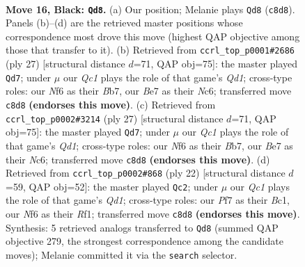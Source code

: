 \documentclass[11pt]{article}
\begin{document}
\clearpage

\begin{figure}[p]\centering
\begin{subfigure}{0.46\textwidth}\centering
\resizebox{\linewidth}{!}{%
\newchessgame
\chessboard[
  setfen={rnq1r1k1/pp1bbppp/4pn2/2Pp4/N2P4/P4N2/1P1B1PPP/1BRQR1K1 b - - 0 16},
  showmover=false,
  pgfstyle=straightmove, color=movearrow, markmove={c8-d8}
]}
\caption{}
\end{subfigure}\hfill
\begin{subfigure}{0.46\textwidth}\centering
\resizebox{\linewidth}{!}{%
\newchessgame
\chessboard[
  setfen={2rq1rk1/pb2bppp/1pn1pn2/8/2NP1B2/P2B1N1P/1P1Q1PP1/2R2RK1 b - - 2 14},
  showmover=false,
  pgfstyle=straightmove, color=movearrow, markmove={d8-d7}
]}
\caption{}
\end{subfigure}
\\[4pt]
\begin{subfigure}{0.46\textwidth}\centering
\resizebox{\linewidth}{!}{%
\newchessgame
\chessboard[
  setfen={2rq1rk1/pb2bppp/1pn1pn2/8/2NP1B2/P2B1N1P/1P1Q1PP1/2R2RK1 b - - 2 14},
  showmover=false,
  pgfstyle=straightmove, color=movearrow, markmove={d8-d7}
]}
\caption{}
\end{subfigure}\hfill
\begin{subfigure}{0.46\textwidth}\centering
\resizebox{\linewidth}{!}{%
\newchessgame
\chessboard[
  setfen={r2qr1k1/pbpn1ppp/1p1b1n2/3p4/1P1P4/P1NBP3/4NPPP/1RBQ1RK1 w - - 3 12},
  showmover=false,
  pgfstyle=straightmove, color=movearrow, markmove={d1-c2}
]}
\caption{}
\end{subfigure}
\caption{\textbf{Move 16, Black: \texttt{Qd8}.} (a) Our position; Melanie plays \texttt{Qd8} (\texttt{c8d8}). Panels (b)--(d) are the retrieved master positions whose correspondence most drove this move (highest QAP objective among those that transfer to it). (b) Retrieved from \texttt{ccrl\_top\_p0001\#2686} (ply 27) [structural distance $d$=71, QAP obj=75]: the master played \texttt{Qd7}; under $\mu$ our \emph{Qc1} plays the role of that game's \emph{Qd1}; cross-type roles: our \emph{N}f6 as their \emph{B}b7, our \emph{B}e7 as their \emph{N}c6; transferred move \texttt{c8d8} \textbf{(endorses this move)}. (c) Retrieved from \texttt{ccrl\_top\_p0002\#3214} (ply 27) [structural distance $d$=71, QAP obj=75]: the master played \texttt{Qd7}; under $\mu$ our \emph{Qc1} plays the role of that game's \emph{Qd1}; cross-type roles: our \emph{N}f6 as their \emph{B}b7, our \emph{B}e7 as their \emph{N}c6; transferred move \texttt{c8d8} \textbf{(endorses this move)}. (d) Retrieved from \texttt{ccrl\_top\_p0002\#868} (ply 22) [structural distance $d$=59, QAP obj=52]: the master played \texttt{Qc2}; under $\mu$ our \emph{Qc1} plays the role of that game's \emph{Qd1}; cross-type roles: our \emph{P}f7 as their \emph{B}c1, our \emph{N}f6 as their \emph{R}f1; transferred move \texttt{c8d8} \textbf{(endorses this move)}. Synthesis: 5 retrieved analogs transferred to \texttt{Qd8} (summed QAP objective 279, the strongest correspondence among the candidate moves); Melanie committed it via the \texttt{search} selector.}
\label{fig:thought-m31}
\end{figure}
\end{document}
